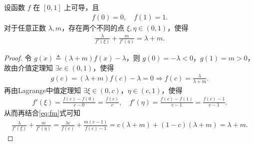 \documentclass[../../main.tex]{subfiles}%
\begin{document}
\begin{example}
设函数 $f$ 在 $[0,1]$ 上可导，且
\begin{align*}
f(0) = 0, \quad f(1) = 1.
\end{align*}
对于任意正数 $\lambda, m$，存在两个不同的点 $\xi, \eta \in (0,1)$，使得
\begin{align*}
\frac{\lambda}{f'(\xi)} + \frac{m}{f'(\eta)} = \lambda + m.
\end{align*}
\end{example}
\begin{proof}
令 $g(x) \triangleq (\lambda + m) f(x) - \lambda$，则 $g(0) = -\lambda < 0$，$g(1) = m > 0$，故由介值定理知 $\exists c \in (0,1)$，使得
\begin{align}
g(c) = (\lambda + m) f(c) - \lambda = 0 \Longrightarrow f(c) = \frac{\lambda}{\lambda + m}. \label{eq:fm}
\end{align}
再由Lagrange中值定理知 $\exists \xi \in (0,c)$，$\eta \in (c,1)$，使得
\begin{align*}
f'(\xi) = \frac{f(c) - f(0)}{c - 0} = \frac{f(c)}{c}, \quad f'(\eta) = \frac{f(c) - f(1)}{c - 1} = \frac{f(c) - 1}{c - 1}.
\end{align*}
从而再结合\eqref{eq:fm}式可知
\begin{align*}
\frac{\lambda}{f'(\xi)} + \frac{m}{f'(\eta)} = \frac{\lambda c}{f(c)} + \frac{m(c-1)}{f(c) - 1} = c(\lambda + m) + (1-c)(\lambda + m) = \lambda + m.
\end{align*}
\end{proof}
\end{document}
